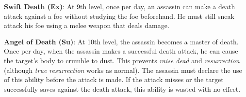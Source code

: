 \textbf{Swift Death (Ex)}: At 9th level, once per day, an assassin can make a death attack against a foe without studying the foe beforehand. He must still sneak attack his foe using a melee weapon that deals damage.
				
\textbf{Angel of Death (Su)}: At 10th level, the assassin becomes a master of death. Once per day, when the assassin makes a successful death attack, he can cause the target's body to crumble to dust. This prevents \textit{raise dead} and \textit{resurrection} (although \textit{true resurrection} works as normal). The assassin must declare the use of this ability before the attack is made. If the attack misses or the target successfully saves against the death attack, this ability is wasted with no effect.
        	
